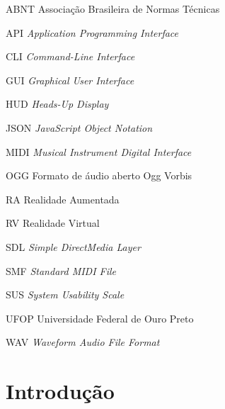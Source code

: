 \documentclass[
  12pt,
  openright,
  twoside,
  a4paper,
  english,
  brazil
]{abntex2}
\begin{document}
\listoffigures*
\cleardoublepage

\listoftables*
\cleardoublepage

\begin{siglas}
  \item[ABNT]  Associação Brasileira de Normas Técnicas
  \item[API]   \textit{Application Programming Interface}
  \item[CLI]   \textit{Command-Line Interface}
  \item[GUI]   \textit{Graphical User Interface}
  \item[HUD]   \textit{Heads-Up Display}
  \item[JSON]  \textit{JavaScript Object Notation}
  \item[MIDI]  \textit{Musical Instrument Digital Interface}
  \item[OGG]   Formato de áudio aberto Ogg Vorbis
  \item[RA]    Realidade Aumentada
  \item[RV]    Realidade Virtual
  \item[SDL]   \textit{Simple DirectMedia Layer}
  \item[SMF]   \textit{Standard MIDI File}
  \item[SUS]   \textit{System Usability Scale}
  \item[UFOP]  Universidade Federal de Ouro Preto
  \item[WAV]   \textit{Waveform Audio File Format}
\end{siglas}

\tableofcontents*
\cleardoublepage

\makeatletter
{}
\makeatother

\textual

\chapter{Introdução}
\end{document}
